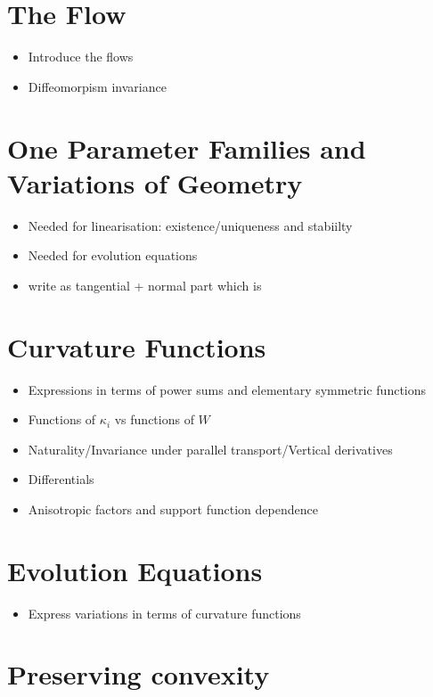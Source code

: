 \section{The Flow}

\begin{itemize}
\item Introduce the flows
\item Diffeomorpism invariance
\end{itemize}

\section{One Parameter Families and Variations of Geometry}

\begin{itemize}
\item Needed for linearisation: existence/uniqueness and stabiilty
\item Needed for evolution equations
\item write as tangential + normal part which is
\end{itemize}

\section{Curvature Functions}

\begin{itemize}
\item Expressions in terms of power sums and elementary symmetric functions
\item Functions of \(\kappa_i\) vs functions of \(W\)
\item Naturality/Invariance under parallel transport/Vertical derivatives
\item Differentials
\item Anisotropic factors and support function dependence
\end{itemize}

\section{Evolution Equations}

\begin{itemize}
\item Express variations in terms of curvature functions
\end{itemize}

\section{Preserving convexity}

